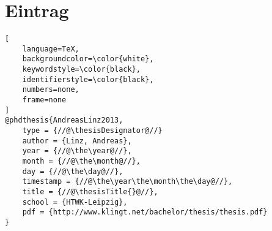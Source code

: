 \chapter*{\BibTeX{} Eintrag}

\begin{lstlisting}[
	language=TeX,
	backgroundcolor=\color{white},
	keywordstyle=\color{black},
	identifierstyle=\color{black},
	numbers=none,
	frame=none
]
@phdthesis{AndreasLinz2013,
	type = {//@\thesisDesignator@//}
	author = {Linz, Andreas},
	year = {//@\the\year@//},
	month = {//@\the\month@//},
	day = {//@\the\day@//},
	timestamp = {//@\the\year\the\month\the\day@//},
	title = {//@\thesisTitle{}@//},
	school = {HTWK-Leipzig},
	pdf = {http://www.klingt.net/bachelor/thesis/thesis.pdf}
}
\end{lstlisting}

